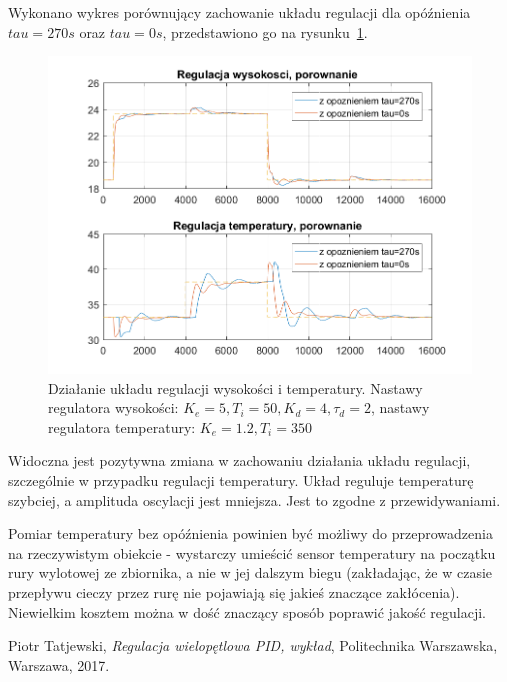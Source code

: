 \documentclass{article}
\begin{document}
Wykonano wykres porównujący zachowanie układu regulacji dla opóźnienia $tau = 270s$ oraz $tau =0s$, przedstawiono go na rysunku~\ref{fig::pid_hT_comparison_notau}.
\begin{figure}[htb]
	\centering
	\includegraphics[width=\textwidth]{pid_hT_comparison_notau.PNG}
	\caption{Działanie układu regulacji wysokości i temperatury. Nastawy regulatora wysokości: $K_e = 5, T_i = 50, K_d=4, \tau_d=2$, nastawy regulatora temperatury: $K_e = 1.2, T_i = 350$}
	\label{fig::pid_hT_comparison_notau}
\end{figure}

Widoczna jest pozytywna zmiana w zachowaniu działania układu regulacji, szczególnie w przypadku regulacji temperatury. Układ reguluje temperaturę szybciej, a amplituda oscylacji jest mniejsza. Jest to zgodne z przewidywaniami.

Pomiar temperatury bez opóźnienia powinien być możliwy do przeprowadzenia na rzeczywistym obiekcie - wystarczy umieścić sensor temperatury na początku rury wylotowej ze zbiornika, a nie w jej dalszym biegu (zakładając, że w czasie przepływu cieczy przez rurę nie pojawiają się jakieś znaczące zakłócenia). Niewielkim kosztem można w dość znaczący sposób poprawić jakość regulacji.

\begin{thebibliography}{9}
  Piotr Tatjewski,
  \emph{Regulacja wielopętlowa PID, wykład},
  Politechnika Warszawska,
  Warszawa, 2017.
  
\end{thebibliography}
\end{document}
